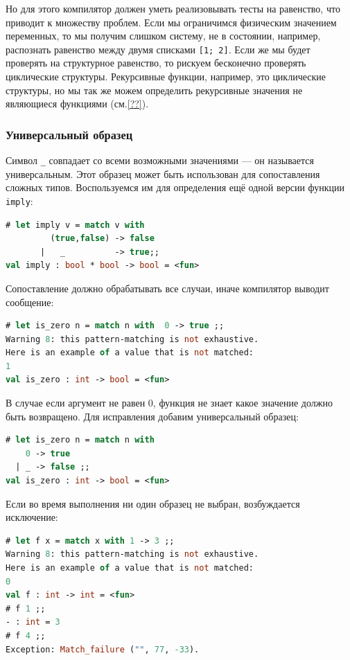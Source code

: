Но для этого компилятор должен уметь реализовывать тесты на равенство, что
приводит к множеству проблем. Если мы ограничимся физическим значением
переменных, то мы получим слишком  систему, не в состоянии,
например, распознать равенство между двумя списками \texttt{[1; 2]}. Если же мы
будет проверять на структурное равенство, то рискуем бесконечно проверять
циклические структуры. Рекурсивные функции, например, это циклические структуры,
но мы так же можем определить рекурсивные значения не являющиеся функциями
(см.\ref{??}).

\subsubsection{Универсальный образец}

Символ \texttt{\_} совпадает со всеми возможными значениями --- он называется
универсальным. Этот образец может быть использован для сопоставления сложных
типов. Воспользуемся им для определения ещё одной версии функции \texttt{imply}:

\begin{lstlisting}[language=OCaml]
# let imply v = match v with
         (true,false) -> false
       |   _          -> true;;
val imply : bool * bool -> bool = <fun>
\end{lstlisting}

Сопоставление должно обрабатывать все случаи, иначе компилятор выводит
сообщение:

\begin{lstlisting}[language=OCaml]
# let is_zero n = match n with  0 -> true ;;
Warning 8: this pattern-matching is not exhaustive.
Here is an example of a value that is not matched:
1
val is_zero : int -> bool = <fun>
\end{lstlisting}

В случае если аргумент не равен 0, функция не знает какое значение должно быть
возвращено. Для исправления добавим универсальный образец:

\begin{lstlisting}[language=OCaml]
# let is_zero n = match n with
    0 -> true
  | _ -> false ;;
val is_zero : int -> bool = <fun>
\end{lstlisting}

Если во время выполнения ни один образец не выбран, возбуждается исключение:

\begin{lstlisting}[language=OCaml]
# let f x = match x with 1 -> 3 ;;
Warning 8: this pattern-matching is not exhaustive.
Here is an example of a value that is not matched:
0
val f : int -> int = <fun>
# f 1 ;;
- : int = 3
# f 4 ;;
Exception: Match_failure ("", 77, -33).
\end{lstlisting}

